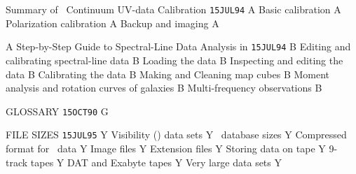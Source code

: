     {Summary of \AIPS\ Continuum UV-data Calibration%
}                    {{\tt 15JUL94}\hskip 0.6cm A}
  {Basic calibration}                            {A}
  {Polarization calibration}                     {A}
  {Backup and imaging}                           {A}

    {A Step-by-Step Guide to Spectral-Line Data
                     Analysis in \AIPS%
}                    {{\tt 15JUL94}\hskip 0.6cm B}
   {Editing and calibrating spectral-line data}   {B}
 {Loading the data}                             {B}
 {Inspecting and editing the data}              {B}
 {Calibrating the data}                         {B}
  {Making and Cleaning map cubes}                {B}
  {Moment analysis and rotation curves of
                      galaxies}                                {B}
  {Multi-frequency observations}                 {B}

    {GLOSSARY%
}                    {{\tt 15OCT90}\hskip 0.6cm G}

     {FILE SIZES%
}                    {{\tt 15JUL95}\hskip 0.6cm Y}
   {Visibility (\uv) data sets}                  {Y}
 {\uv\ database sizes}                         {Y}
 {Compressed format for \uv\ data}             {Y}
   {Image files}                                 {Y}
   {Extension files}                             {Y}
   {Storing data on tape}                        {Y}
 {9-track tapes}                               {Y}
 {DAT and Exabyte tapes}                       {Y}
   {Very large data sets}                        {Y}

